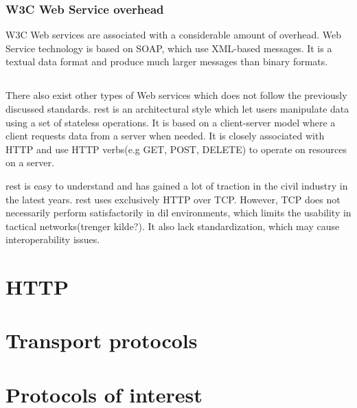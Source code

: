 \subsubsection{W3C Web Service overhead}

W3C Web services are associated with a considerable amount of overhead. Web
Service technology is based on SOAP, which use XML-based messages. It is a
textual data format and produce much larger messages than binary formats.


\subsection{}
\label{rest}

There also exist other types of Web services which does not follow the
previously discussed standards. \gls{rest} is an architectural style which let
users manipulate data using a set of stateless operations. It is based on a
client-server model where a client requests data from a server when needed. It
is closely associated with HTTP and use HTTP verbs(e.g GET, POST,
DELETE) to operate on resources on a server.

 \gls{rest} is easy to understand and has gained a lot of traction in the
civil  industry in the latest years. \gls{rest} uses exclusively HTTP over
TCP.  However, TCP does not necessarily perform satisfactorily in \gls{dil}
environments, which limits the usability in tactical networks(trenger kilde?).
It also lack standardization, which may cause interoperability issues.



\section{HTTP}

\section{Transport protocols}


\section{Protocols of interest}



